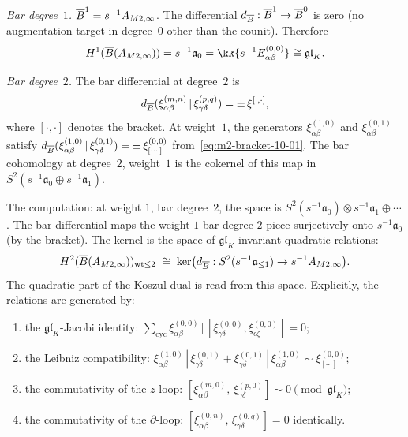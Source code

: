 \begin{computation}

\emph{Bar degree~$1$.}
$\overline{B}^1 = s^{-1}A_{M2,\infty}$. The differential
$d_{\overline{B}}:\overline{B}^1\to\overline{B}^0$ is zero (no augmentation target
in degree~$0$ other than the counit). Therefore
\[
H^1(\barB(A_{M2,\infty}))
= s^{-1}\mathfrak{a}_0
= \kk\{s^{-1}E^{(0,0)}_{\alpha\beta}\}
\cong \mathfrak{gl}_K.
\]

\emph{Bar degree~$2$.}
The bar differential at degree~$2$ is
\[
d_{\overline{B}}(\xi^{(m,n)}_{\alpha\beta}\,|\,
\xi^{(p,q)}_{\gamma\delta})
= \pm\, \xi^{[\cdot,\cdot]},
\]
where $[\cdot,\cdot]$ denotes the bracket.
At weight~$1$, the generators
$\xi^{(1,0)}_{\alpha\beta}$ and $\xi^{(0,1)}_{\alpha\beta}$
satisfy
$d_{\overline{B}}(\xi^{(1,0)}_{\alpha\beta}\,|\,
\xi^{(0,1)}_{\gamma\delta})
= \pm\,\xi^{(0,0)}_{[\cdots]}$
from~\eqref{eq:m2-bracket-10-01}. The bar cohomology at degree~$2$,
weight~$1$ is the cokernel of this map in
$S^2(s^{-1}\mathfrak{a}_0\oplus s^{-1}\mathfrak{a}_1)$.

The computation: at weight $1$, bar degree~$2$, the space is
$S^2(s^{-1}\mathfrak{a}_0)\otimes s^{-1}\mathfrak{a}_1
\oplus \cdots$. The bar differential maps the weight-$1$
bar-degree-$2$ piece surjectively onto $s^{-1}\mathfrak{a}_0$
(by the bracket). The kernel is the space of
$\mathfrak{gl}_K$-invariant quadratic relations:
\begin{equation}%
H^2(\barB(A_{M2,\infty}))_{\mathrm{wt}\le 2}
\;\cong\;
\ker\bigl(
d_{\barB}: S^2(s^{-1}\mathfrak{a}_{\le 1})
\to s^{-1}A_{M2,\infty}
\bigr).
\end{equation}
The quadratic part of the Koszul dual is read from this space.
Explicitly, the relations are generated by:
\begin{enumerate}[label=(\roman*),leftmargin=1.8em]
\item the $\mathfrak{gl}_K$-Jacobi identity:
$\sum_{\mathrm{cyc}}\xi^{(0,0)}_{\alpha\beta}\,|\,
[\xi^{(0,0)}_{\gamma\delta},\xi^{(0,0)}_{\epsilon\zeta}]=0$;
\item the Leibniz compatibility:
$\xi^{(1,0)}_{\alpha\beta}\,|\,\xi^{(0,1)}_{\gamma\delta}
+\xi^{(0,1)}_{\gamma\delta}\,|\,\xi^{(1,0)}_{\alpha\beta}
\sim \xi^{(0,0)}_{[\cdots]}$;
\item the commutativity of the $z$-loop:
$[\xi^{(m,0)}_{\alpha\beta},\,\xi^{(p,0)}_{\gamma\delta}]
\sim 0 \pmod{\mathfrak{gl}_K}$;
\item the commutativity of the $\partial$-loop:
$[\xi^{(0,n)}_{\alpha\beta},\,\xi^{(0,q)}_{\gamma\delta}]
= 0$ identically.
\end{enumerate}


\end{computation}
